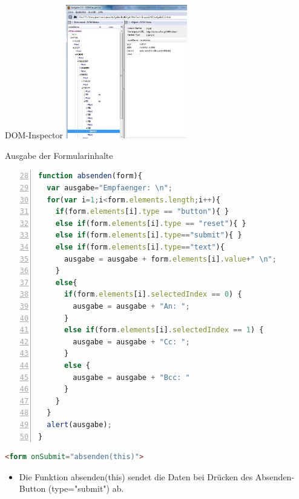 \begin{frame}[<+->]{DOM-Inspector}
\includegraphics[width = 200px]{../A2/src/dom_inspector.jpg}
\end{frame}
\begin{frame}[<+->][fragile]{Ausgabe der Formularinhalte}
\tiny{\begin{lstlisting}[language=JavaScript, 
		   numbers=left,
		   numbersep=3pt,
		   firstnumber=28]
function absenden(form){
  var ausgabe="Empfaenger: \n";
  for(var i=1;i<form.elements.length;i++){
    if(form.elements[i].type == "button"){ }
    else if(form.elements[i].type == "reset"){ }
    else if(form.elements[i].type=="submit"){ }
    else if(form.elements[i].type=="text"){
      ausgabe = ausgabe + form.elements[i].value+" \n";
    }
    else{
      if(form.elements[i].selectedIndex == 0) {
        ausgabe = ausgabe + "An: ";	 
      }
      else if(form.elements[i].selectedIndex == 1) {
        ausgabe = ausgabe + "Cc: ";
      }
      else {
        ausgabe = ausgabe + "Bcc: "
      }
    }
  }
  alert(ausgabe);
}
\end{lstlisting}}
\tiny{\begin{lstlisting}[language = HTML,
                                   mathescape = true, 
                   breaklines=true,  
                   numbersep = 3pt]
<form onSubmit="absenden(this)">
\end{lstlisting}}
\normalsize
\begin{itemize}

\item Die Funktion absenden(this) sendet die Daten bei Drücken des Absenden-Button (type="submit") ab.

\end{itemize}
\end{frame}